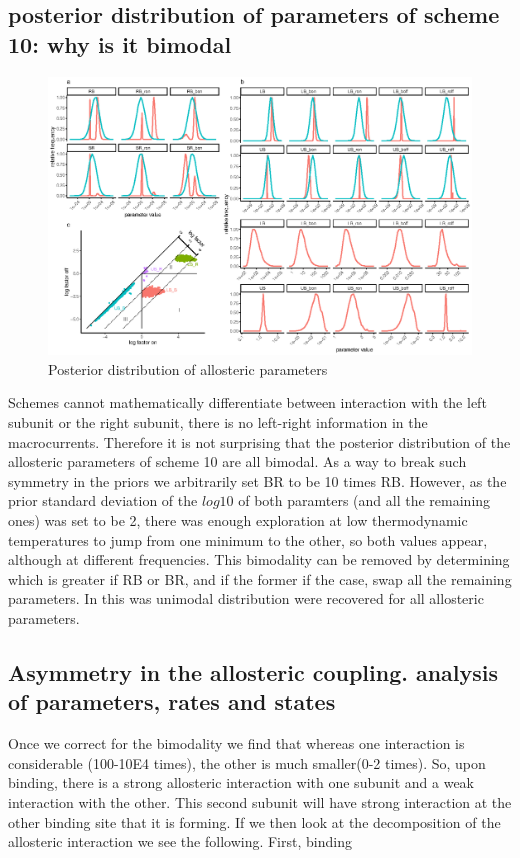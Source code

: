 \documentclass[pdflatex,sn-mathphys-num]{sn-jnl}%
\theoremstyle{thmstyleone}%
\theoremstyle{thmstyletwo}%
\theoremstyle{thmstylethree}%
\begin{document}
\subsection{posterior distribution of parameters of scheme 10: why is it bimodal}

\begin{figure}[h]
\centering
\includegraphics[width=1.0\textwidth]{Figure_2_ABC.eps}
\caption{Posterior distribution of allosteric parameters}\label{fig_bimodal}
\end{figure}


Schemes cannot mathematically differentiate between interaction with the left subunit or the right subunit, there is no left-right information in the macrocurrents. Therefore it is not surprising that the posterior distribution of the allosteric parameters of scheme 10 are all bimodal. As a way to break such symmetry in the priors we arbitrarily set BR to be 10 times RB. However, as the prior standard deviation of the $log10$ of both paramters (and all the remaining ones) was set to be 2, there was enough exploration at low thermodynamic temperatures to jump from one minimum to the other, so both values appear, although at different frequencies. 
This bimodality can be removed by determining which is greater if RB or BR, and if the former if the case, swap all the remaining parameters. In this was unimodal distribution were recovered for all allosteric parameters. 

\subsection{Asymmetry in the allosteric coupling. analysis of parameters, rates and states}
Once we correct for the bimodality we find that whereas one interaction is considerable (100-10E4 times), the other is much smaller(0-2 times). So, upon binding, there is a strong allosteric interaction with one subunit and a weak interaction with the other. This second subunit will have strong interaction at the other binding site that it is forming. 
If we then look at the decomposition of the allosteric interaction we see the following.
First, binding 
\end{document}
